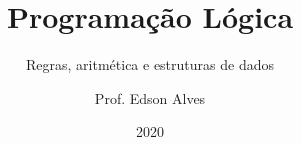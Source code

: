 \title{Programação Lógica}
\subtitle{Regras, aritmética e estruturas de dados}
\date{2020}
\author{Prof. Edson Alves}
